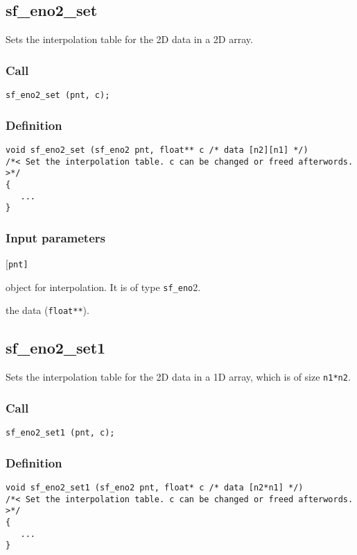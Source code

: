 \subsection{{sf\_eno2\_set}}
Sets the interpolation table for the 2D data in a 2D array.

\subsubsection*{Call}
\begin{verbatim}sf_eno2_set (pnt, c);\end{verbatim}

\subsubsection*{Definition}
\begin{verbatim}
void sf_eno2_set (sf_eno2 pnt, float** c /* data [n2][n1] */)
/*< Set the interpolation table. c can be changed or freed afterwords. >*/
{
   ...    
}
\end{verbatim}

\subsubsection*{Input parameters}
\begin{desclist}{\tt }{\quad}[\tt pnt]
   \setlength\itemsep{0pt}
   \item[pnt] object for interpolation. It is of type \texttt{sf\_eno}2.
   \item[c]   the data (\texttt{float**}).  
\end{desclist}





\subsection{{sf\_eno2\_set1}}
Sets the interpolation table for the 2D data in a 1D array, which is of size \texttt{n1*n2}.

\subsubsection*{Call}
\begin{verbatim}sf_eno2_set1 (pnt, c);\end{verbatim}

\subsubsection*{Definition}
\begin{verbatim}
void sf_eno2_set1 (sf_eno2 pnt, float* c /* data [n2*n1] */)
/*< Set the interpolation table. c can be changed or freed afterwords. >*/
{
   ...
}
\end{verbatim}

